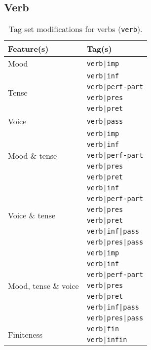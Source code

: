 \documentclass[a4paper,12pt,english]{book}
\begin{document}
\begin{appendices}
    \section{Verb}
    \begin{table}
        \centering
        \smaller[1]
        \begin{tabular}{@{}ll@{}}
            \toprule
            \textbf{Feature(s)} & \textbf{Tag(s)} \\
            \midrule
            Mood & \texttt{verb|imp} \\
            \midrule
            \multirow{4}{*}{Tense}
            & \texttt{verb|inf} \\
            & \texttt{verb|perf-part} \\
            & \texttt{verb|pres} \\
            & \texttt{verb|pret} \\
            \midrule
            Voice & \texttt{verb|pass} \\
            \midrule
            \multirow{5}{*}{Mood \& tense}
            & \texttt{verb|imp} \\
            & \texttt{verb|inf} \\
            & \texttt{verb|perf-part} \\
            & \texttt{verb|pres} \\
            & \texttt{verb|pret} \\
            \midrule
            \multirow{6}{*}{Voice \& tense}
            & \texttt{verb|inf} \\
            & \texttt{verb|perf-part} \\
            & \texttt{verb|pres} \\
            & \texttt{verb|pret} \\
            & \texttt{verb|inf|pass} \\
            & \texttt{verb|pres|pass} \\
            \midrule
            \multirow{7}{*}{Mood, tense \& voice}
            & \texttt{verb|imp} \\
            & \texttt{verb|inf} \\
            & \texttt{verb|perf-part} \\
            & \texttt{verb|pres} \\
            & \texttt{verb|pret} \\
            & \texttt{verb|inf|pass} \\
            & \texttt{verb|pres|pass} \\
            \midrule
            \multirow{2}{*}{Finiteness}
            & \texttt{verb|fin} \\
            & \texttt{verb|infin} \\
            \bottomrule
        \end{tabular}
        \caption{Tag set modifications for verbs (\texttt{verb}).}
        \label{verbtagsets}
    \end{table}


\end{appendices}
\end{document}
